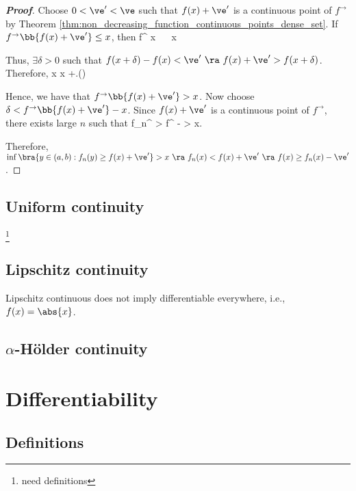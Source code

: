 \begin{proof}[\bf Proof]


Choose $0<\ve'<\ve$ such that $f(x)+\ve'$ is a continuous point of $f^{\to}$ by Theorem \ref{thm:non_decreasing_function_continuous_points_dense_set}. If $f^{\to}\bb{f(x)+\ve'} \leq x$, then
\be
f^{\to} \leq x \ \ra\ \inf{} \leq x
\ee

Thus, $\exists \delta >0$ such that $f(x+\delta)-f(x)< \ve' \ \ra \ f(x)+\ve' > f(x+\delta)$. Therefore,
\be
x\geq \inf{} \geq x +\delta.\qquad ()
\ee

Hence, we have that $f^{\to}\bb{f(x)+\ve'} > x$. Now choose $\delta < f^{\to}\bb{f(x)+\ve'}-x$. Since $f(x)+\ve'$ is a continuous point of $f^{\to}$, there exists large $n$ such that
\be
f_n^{\to} > f^{\to} - \delta > x.
\ee

Therefore, $\inf\bra{y\in (a,b): f_n(y) \geq f(x)+\ve'} > x \ \ra\  f_n(x) < f(x)+\ve' \ \ra\ f(x) \geq f_n(x) - \ve'$.
\end{proof}


\subsection{Uniform continuity}

\footnote{need definitions}

\subsection{Lipschitz continuity}

Lipschitz continuous does not imply differentiable everywhere, i.e., $f(x)= \abs{x}$.

\subsection{$\alpha$-H\"older continuity}


\section{Differentiability}

\subsection{Definitions}

